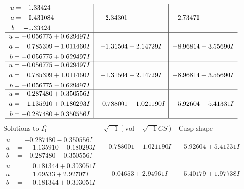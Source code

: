 \documentclass[1p]{elsarticle_modified}
\theoremstyle{definition}
\newcommand{\I}{\sqrt{-1}}
\begin{document}
$$\begin{array}{c|c|c}
\begin{aligned}
u &= -1.33424\phantom{ +0.000000I} \\
a &= -0.431084\phantom{ +0.000000I} \\
b &= -1.33424\phantom{ +0.000000I}\end{aligned}
 & -2.34301\phantom{ +0.000000I} & \phantom{-}2.73470\phantom{ +0.000000I} \\ \hline\begin{aligned}
u &= -0.056775 + 0.629497 I \\
a &= \phantom{-}0.785309 - 1.011460 I \\
b &= -0.056775 + 0.629497 I\end{aligned}
 & -1.31504 + 2.14729 I & -8.96814 - 3.55690 I \\ \hline\begin{aligned}
u &= -0.056775 - 0.629497 I \\
a &= \phantom{-}0.785309 + 1.011460 I \\
b &= -0.056775 - 0.629497 I\end{aligned}
 & -1.31504 - 2.14729 I & -8.96814 + 3.55690 I \\ \hline\begin{aligned}
u &= -0.287480 + 0.350556 I \\
a &= \phantom{-}1.135910 + 0.180293 I \\
b &= -0.287480 + 0.350556 I\end{aligned}
 & -0.788001 + 1.021190 I & -5.92604 - 5.41331 I\\
 \hline 
 \end{array}$$\newpage$$\begin{array}{c|c|c}  
\text{Solutions to }I^u_{1}& \I (\text{vol} + \sqrt{-1}CS) & \text{Cusp shape}\\
 \hline 
\begin{aligned}
u &= -0.287480 - 0.350556 I \\
a &= \phantom{-}1.135910 - 0.180293 I \\
b &= -0.287480 - 0.350556 I\end{aligned}
 & -0.788001 - 1.021190 I & -5.92604 + 5.41331 I \\ \hline\begin{aligned}
u &= \phantom{-}0.181344 + 0.303051 I \\
a &= \phantom{-}1.69533 + 2.92707 I \\
b &= \phantom{-}0.181344 + 0.303051 I\end{aligned}
 & \phantom{-}0.04653 + 2.94961 I & -5.40179 + 1.97738 I \\ \hline\begin{aligned}

\end{aligned}
\end{array}$$
\end{document}
